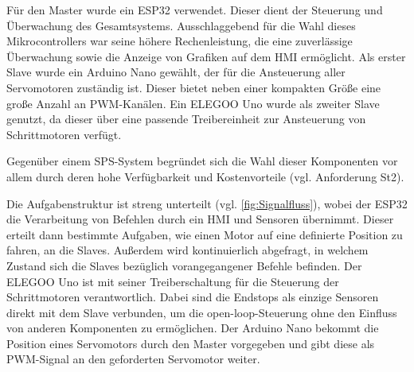 Für den Master wurde ein ESP32 verwendet. Dieser dient der Steuerung und Überwachung des Gesamtsystems. Ausschlaggebend für die Wahl
dieses Mikrocontrollers war seine höhere Rechenleistung, die eine zuverlässige Überwachung sowie die Anzeige von Grafiken auf
dem HMI ermöglicht. Als erster Slave wurde ein Arduino Nano gewählt, der für die Ansteuerung aller Servomotoren zuständig ist. Dieser
bietet neben einer kompakten Größe eine große Anzahl an PWM-Kanälen. Ein ELEGOO Uno wurde als zweiter Slave genutzt, da dieser über
eine passende Treibereinheit zur Ansteuerung von Schrittmotoren verfügt.

Gegenüber einem SPS-System begründet sich die Wahl dieser
Komponenten vor allem durch deren hohe Verfügbarkeit und Kostenvorteile (vgl. Anforderung St2).

Die Aufgabenstruktur ist streng unterteilt (vgl. \cref{fig:Signalfluss}), wobei der ESP32 die Verarbeitung von Befehlen durch ein HMI und Sensoren
übernimmt. Dieser erteilt dann bestimmte Aufgaben, wie einen Motor auf eine definierte Position zu fahren, an die Slaves. Außerdem
wird kontinuierlich abgefragt, in welchem Zustand sich die Slaves bezüglich vorangegangener Befehle befinden. Der ELEGOO Uno
ist mit seiner Treiberschaltung für die Steuerung der Schrittmotoren verantwortlich. Dabei sind die Endstops als einzige Sensoren
direkt mit dem Slave verbunden, um die open-loop-Steuerung ohne den Einfluss von anderen Komponenten zu ermöglichen.
Der Arduino Nano bekommt die Position eines Servomotors durch den Master vorgegeben und gibt diese als PWM-Signal an den geforderten
Servomotor weiter.

